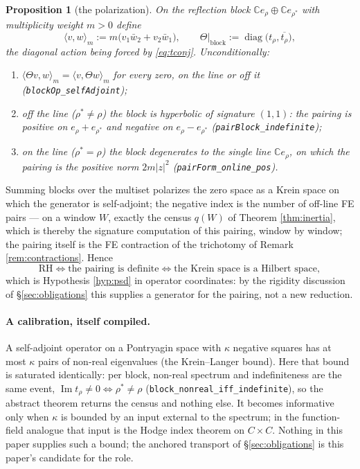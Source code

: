 \documentclass[11pt]{article}
\theoremstyle{plain}
\newtheorem{proposition}[theorem]{Proposition}
\theoremstyle{definition}
\theoremstyle{remark}
\newcommand{\C}{\mathbb{C}}
\begin{document}
\begin{proposition}[the polarization]\label{prop:polarization}
On the reflection block $\C e_\rho\oplus\C e_{\rho^*}$ with multiplicity
weight $m>0$ define
\[
  \langle v,w\rangle_m := m\bigl(v_1\bar w_2 + v_2\bar w_1\bigr),
  \qquad
  \Theta\big|_{\mathrm{block}} :=
    \operatorname{diag}\bigl(t_\rho,\overline{t_\rho}\bigr),
\]
the diagonal action being forced by \eqref{eq:tconj}. Unconditionally:
\begin{enumerate}
\item[(i)] $\langle\Theta v,w\rangle_m=\langle v,\Theta w\rangle_m$ for every
zero, on the line or off it (\texttt{blockOp\_selfAdjoint});
\item[(ii)] off the line ($\rho^*\ne\rho$) the block is hyperbolic of
signature $(1,1)$: the pairing is positive on $e_\rho+e_{\rho^*}$ and negative
on $e_\rho-e_{\rho^*}$ (\texttt{pairBlock\_indefinite});
\item[(iii)] on the line ($\rho^*=\rho$) the block degenerates to the single
line $\C e_\rho$, on which the pairing is the positive norm $2m|z|^2$
(\texttt{pairForm\_online\_pos}).
\end{enumerate}
\end{proposition}

Summing blocks over the multiset polarizes the zero space as a Krein space on
which the generator is self-adjoint; the negative index is the number of
off-line FE pairs --- on a window $W$, exactly the census $q(W)$ of Theorem
\ref{thm:inertia}, which is thereby the signature computation of this pairing,
window by window; the pairing itself is the FE contraction of the trichotomy
of Remark \ref{rem:contractions}. Hence
\[
  \text{RH}\iff\text{the pairing is definite}
          \iff\text{the Krein space is a Hilbert space},
\]
which is Hypothesis \ref{hyp:psd} in operator coordinates: by the rigidity
discussion of \S\ref{sec:obligations} this supplies a generator for the
pairing, not a new reduction.

\paragraph{A calibration, itself compiled.}
A self-adjoint operator on a Pontryagin space with $\kappa$ negative squares
has at most $\kappa$ pairs of non-real eigenvalues (the Krein--Langer bound).
Here that bound is saturated identically: per block, non-real spectrum and
indefiniteness are the same event,
$\operatorname{Im}t_\rho\ne0\iff\rho^*\ne\rho$
(\texttt{block\_nonreal\_iff\_indefinite}), so the abstract theorem returns
the census and nothing else. It becomes informative only when $\kappa$ is
bounded by an input external to the spectrum; in the function-field analogue
that input is the Hodge index theorem on $C\times C$. Nothing in this paper
supplies such a bound; the anchored transport of \S\ref{sec:obligations} is
this paper's candidate for the role.
\end{document}
